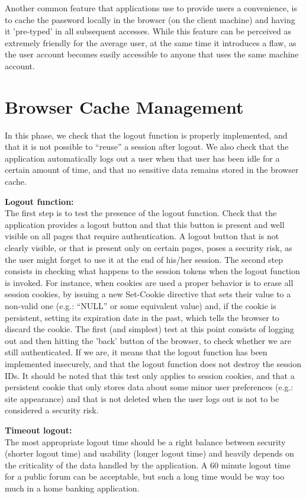 	Another common feature that applications use to provide users a convenience, is to cache the 
	password locally in the browser (on the client machine) and having it 'pre-typed' in all 
	subsequent accesses. While this feature can be perceived as extremely friendly for the average 
	user, at the same time it introduces a flaw, as the user account becomes easily accessible
	to anyone that uses the same machine account.

\section{Browser Cache Management}
	In this phase, we check that the logout function is properly implemented, and that it is not 
	possible to “reuse” a session after logout. We also check that the application automatically 
	logs out a user when that user has been idle for a certain amount of time, and that no sensitive 
	data remains stored in the browser cache.

	{\bf Logout function:} \\
	The first step is to test the presence of the logout function. Check that the application provides 
	a logout button and that this button is present and well visible on all pages that require  
	authentication. A logout button that is not clearly visible, or that is present only on certain 
	pages, poses a security risk, as the user might forget to use it at the end of his/her session.
	The second step consists in checking what happens to the session tokens when the logout function 
	is invoked. For instance, when cookies are used a proper behavior is to erase all session cookies, 
	by issuing a new Set-Cookie directive that sets their value to a non-valid one (e.g.: “NULL” or 
	some equivalent value) and, if the cookie is persistent, setting its expiration date in the past, 
	which tells the browser to discard the cookie. The first (and simplest) test at this point consists 
	of logging out and then hitting the 'back' button of the browser, to check whether we are still
	authenticated. If we are, it means that the logout function has been implemented insecurely, and 
	that the logout function does not destroy the session IDs. It should be noted that this test only 
	applies to session cookies, and that a persistent cookie that only stores data about some minor 
	user preferences (e.g.: site appearance) and that is not deleted when the user logs out is not 
	to be considered a security risk.

	{\bf Timeout logout:} \\
	The most appropriate logout time should be a right balance between security (shorter logout time) 
	and usability (longer logout time) and heavily depends on the criticality of the data handled by 
	the application. A 60 minute logout time for a public forum can be acceptable, but such a long time 
	would be way too much in a home banking application.

